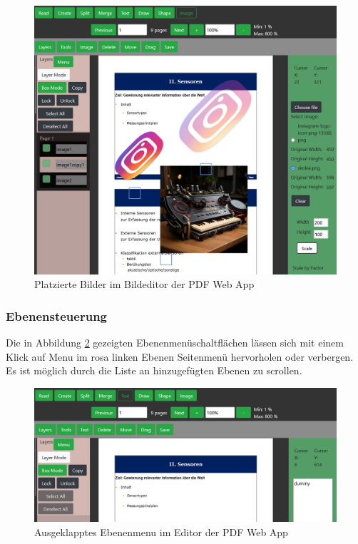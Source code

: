 \begin{figure}[!htbp]
	\centering
	\includegraphics[width=1\textwidth]{"images/imaging.png"}
	\caption{Platzierte Bilder im Bildeditor der PDF Web App}
	\label{fig:imaging}
\end{figure}



\subsubsection{Ebenensteuerung}
Die in Abbildung \ref{fig:ebenenmenu} gezeigten Ebenenmenüschaltflächen lässen sich mit einem Klick auf Menu im rosa linken Ebenen Seitenmenü hervorholen oder verbergen. Es ist möglich durch die Liste an hinzugefügten Ebenen zu scrollen.

\begin{figure}[!htbp]
	\centering
	\includegraphics[width=1\textwidth]{"images/ebenenmenu.png"}
	\caption{Ausgeklapptes Ebenenmenu im Editor der PDF Web App}
	\label{fig:ebenenmenu}
\end{figure}

